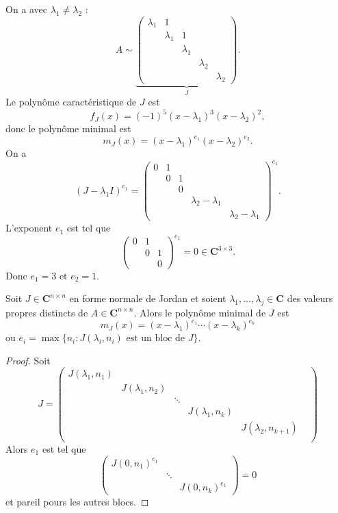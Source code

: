 \begin{example}
On a avec $\lambda_{1}\neq\lambda_{2}$ :
$$
A \sim \underbrace{ \begin{pmatrix}
\lambda_{1} & 1 \\
 & \lambda _{1} & 1 \\
 &  & \lambda _{1} &  \\
 &  &  & \lambda _{2} \\
 &  &  &  & \lambda _{2}
\end{pmatrix} }_{ J }.
$$
Le polynôme caractéristique de $J$ est 
$$
f_{J}(x)=(-1)^{5}(x-\lambda _{1})^{3}(x-\lambda_{2})^{2},
$$
donc le polynôme minimal est
$$
m_{J}(x)=(x-\lambda_{1})^{e_{1}}(x-\lambda_{2})^{e_{2}}.
$$
On a 
$$
(J-\lambda_{1}I)^{e_{1}}=\begin{pmatrix}
0 & 1 \\
 & 0 & 1 \\
 &  & 0 \\
 &  &  & \lambda_{2}-\lambda_{1} \\
 &  &  &  & \lambda_{2}-\lambda_{1}
\end{pmatrix}^{e_{1}}.
$$
L'exponent $e_{1}$ est tel que
$$
\begin{pmatrix}
0 & 1 \\
 & 0 & 1 \\
 &  & 0
\end{pmatrix}^{e_{1}}=0\in \mathbf{C}^{3\times3}.
$$
Donc $e_{1}=3$ et $e_{2}=1$.
\end{example}
\begin{lemma}
Soit $J\in \mathbf{C}^{n\times n}$ en forme normale de Jordan et soient $\lambda_{1},\dots,\lambda _{j}\in \mathbf{C}$ des valeurs propres distincts de $A\in \mathbf{C}^{n\times n}$. Alors le polynôme minimal de $J$ est
$$
m_{J}(x)=(x-\lambda_{1})^{e_{1}}\cdots(x-\lambda _{k})^{e_{k}}
$$
ou $e_{i}=\max\{ n_{i}:J(\lambda _{i},n_{i})\text{ est un bloc de }J \}$. 
\end{lemma}
\begin{proof}
Soit 
$$
J=\begin{pmatrix}
J(\lambda_{1},n_{1}) \\
 & J(\lambda_{1},n_{2}) \\
 &  & \ddots  \\
 &  &  & J(\lambda_{1},n_{k}) \\
 &  &  &  &  J(\lambda_{2},n_{k+1}) \\
 &  &  &  &  &
\end{pmatrix}
$$
Alors $e_{1}$ est tel que
$$
\begin{pmatrix}
J(0,n_{1})^{e_{1}} \\
 &  \ddots \\
 &  &  J(0,n_{k})^{e_{1}}
\end{pmatrix}=0
$$
et pareil pours les autres blocs.
\end{proof}
